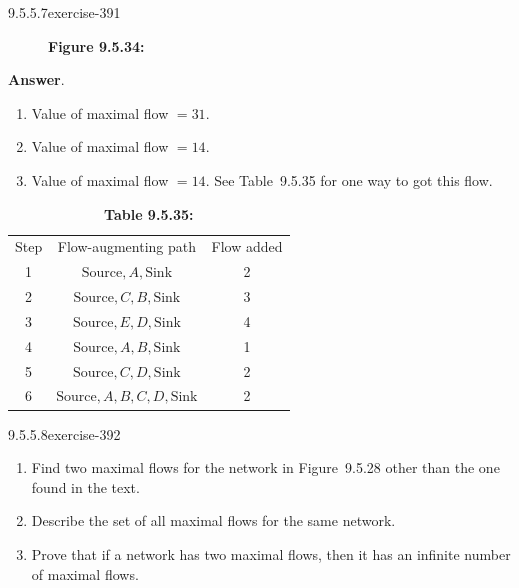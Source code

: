 \documentclass[twoside,10pt,]{book}
\numberwithin{equation}{section}
\newcommand{\hrulethick} {\noalign{\hrule height 0.11em}}
\begin{document}
\begin{divisionsolution}{9.5.5.7}{}{exercise-391}
\begin{figure}
\caption*{\textbf{Figure 9.5.34:} }
\end{figure}
\par\smallskip%
\noindent\textbf{Answer}.\quad%
\hypertarget{p-3408}{}%
\leavevmode%
\begin{enumerate}[label=(\alph*)]
\item\hypertarget{li-1603}{}\hypertarget{p-3409}{}%
Value of maximal flow \(=31\).%
\item\hypertarget{li-1604}{}\hypertarget{p-3410}{}%
Value of maximal flow \(=14\).%
\item\hypertarget{li-1605}{}\hypertarget{p-3411}{}%
Value of maximal flow \(=14\). See Table~9.5.35 for one way to got this flow.%
\end{enumerate}
%
\begin{table}
\centering
\begin{tabular}{ccc}\hrulethick
Step&Flow-augmenting path&Flow added\tabularnewline[0pt]
1&\(\text{Source},A,\text{Sink}\)&2\tabularnewline[0pt]
2&\(\text{Source}, C,B, \text{Sink}\)&3\tabularnewline[0pt]
3&\(\text{Source},E,D, \text{Sink}\)&4\tabularnewline[0pt]
4&\(\text{Source},A,B,\text{Sink}\)&1\tabularnewline[0pt]
5&\(\text{Source},C,D, \text{Sink}\)&2\tabularnewline[0pt]
6&\(\text{Source},A,B,C,D, \text{Sink}\)&2
\end{tabular}
\caption*{\textbf{Table 9.5.35:} }
\end{table}
\end{divisionsolution}%
\begin{divisionsolution}{9.5.5.8}{}{exercise-392}%
\hypertarget{p-3412}{}%
\leavevmode%
\begin{enumerate}[label=(\alph*)]
\item\hypertarget{li-1606}{}\hypertarget{p-3413}{}%
Find two maximal flows for the network in Figure~9.5.28 other than the one found in the text.%
\item\hypertarget{li-1607}{}\hypertarget{p-3414}{}%
Describe the set of all maximal flows for the same network.%
\item\hypertarget{li-1608}{}\hypertarget{p-3415}{}%
Prove that if a network has two maximal flows, then it has an infinite number of maximal flows.%
\end{enumerate}
%
\end{divisionsolution}%
\end{document}

